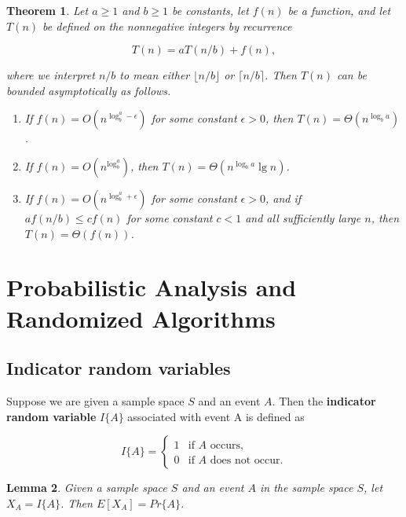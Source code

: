 \documentclass[12pt]{article}
\newtheorem{theorem}{Theorem}
\newtheorem{lemma}[theorem]{Lemma}
\begin{document}
\begin{theorem}
  Let $a \ge 1$ and $b \ge 1$ be constants, let $f(n)$ be a function, and let $T(n)$ be defined on the nonnegative integers by recurrence

  \begin{equation*}
    T(n) = aT(n/b) + f(n),
  \end{equation*}

  where we interpret $n/b$ to mean either $\lfloor n/b \rfloor$ or $\lceil n/b \rceil$. Then $T(n)$ can be bounded asymptotically as follows.

  \begin{enumerate}
  \item If $f(n) = O(n^{\log_b^a - \epsilon})$ for some constant $\epsilon > 0$, then $T(n) = \Theta (n^{\log_b a})$.
  \item If $f(n) = O(n^{\log_b^a})$, then $T(n) = \Theta (n^{\log_b a} \lg n)$.
  \item If $f(n) = O(n^{\log_b^a + \epsilon})$ for some constant $\epsilon > 0$, and if $af(n/b) \le cf(n)$ for some constant $c < 1$ and all sufficiently large $n$, then $T(n) = \Theta \left( f(n) \right)$.
  \end{enumerate}

\end{theorem}

\section{Probabilistic Analysis and Randomized Algorithms}

\subsection{Indicator random variables}

Suppose we are given a sample space $S$ and an event $A$. Then the \textbf {indicator random variable} $I\{A\}$ associated with event A is defined as

\begin{equation*}
  I\{A\} =
  \begin{cases}
    1 & \text{if $A$ occurs,} \\
    0 & \text{if $A$ does not occur.}
  \end{cases}
\end{equation*}

\begin{lemma}
  Given a sample space $S$ and an event $A$ in the sample space $S$, let $X_A = I\{ A \}$. Then $E[X_A] = Pr \{ A \}$.
\end{lemma}
\end{document}
